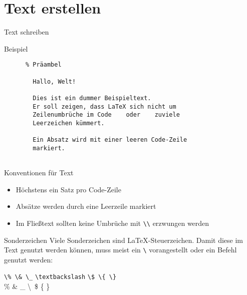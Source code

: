 \section{Text erstellen}

\begin{frame}[fragile]{Text schreiben}
  \begin{block}{Beispiel}
    \begin{lstlisting}
      % Präambel
      
        Hallo, Welt!

        Dies ist ein dummer Beispieltext.
        Er soll zeigen, dass LaTeX sich nicht um
        Zeilenumbrüche im Code    oder    zuviele
        Leerzeichen kümmert.

        Ein Absatz wird mit einer leeren Code-Zeile
        markiert.
      
    \end{lstlisting}
  \end{block}
\end{frame}

\begin{frame}[fragile]{Konventionen für Text}
  \begin{itemize}
    \item Höchstens ein Satz pro Code-Zeile
    \item Absätze werden durch eine Leerzeile markiert
    \item Im Fließtext sollten keine Umbrüche mit \verb+\\+ erzwungen werden
  \end{itemize}
  \begin{alertblock}{Sonderzeichen}
    Viele Sonderzeichen sind \LaTeX-Steuerzeichen.
    Damit diese im Text genutzt werden können, muss meist ein \verb+\+ vorangestellt oder ein Befehl genutzt werden:
    \begin{center}
      \verb+\% \& \_+ \lstinline+\textbackslash+ \verb+\$ \{ \}+ \\
      \% \& \_ \textbackslash\ \$ \{ \}
    \end{center}
  \end{alertblock}
\end{frame}


